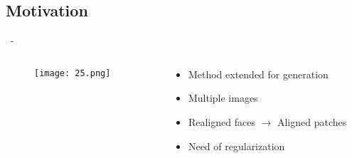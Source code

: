 \documentclass[aspectratio=169, 22pt]{beamer}
\begin{document}
\subsection{Motivation}
\begin{frame}{\secname~- \subsecname}
  \begin{columns}
    \begin{column}{0.3\linewidth}
      \begin{figure}
        \centering
        \texttt{[image: 25.png]}
      \end{figure}
    \end{column}
    \begin{column}{0.7\linewidth}
      \begin{itemize}
      \item Method extended for generation
      \item Multiple images
      \item Realigned faces $\rightarrow$ Aligned patches
        \vspace{1em}
      \item Need of \alert{regularization}
      \end{itemize}
    \end{column}
  \end{columns}
\end{frame}
\end{document}
